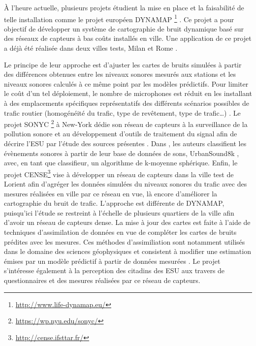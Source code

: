 \`A l'heure actuelle, plusieurs projets étudient la mise en place et la faisabilité de telle installation comme le projet européen DYNAMAP \footnote{\url{http://www.life-dynamap.eu/}} \cite{dynamap_2016}. Ce projet a pour objectif de développer un système de cartographie de bruit dynamique basé sur des réseaux de capteurs à bas coûts installés en ville. Une application de ce projet a déjà été réalisée dans deux villes tests, Milan et Rome \cite{bellucci_life_2017}.


Le principe de leur approche est d'ajuster les cartes de bruits simulées à partir des différences obtenues entre les niveaux sonores mesurés aux stations et les niveaux sonores calculés à ce même point par les modèles prédictifs. Pour limiter le coût d'un tel déploiement, le nombre de microphones est réduit en les installant à des emplacements spécifiques représentatifs des différents scénarios possibles de trafic routier (homogénéité du trafic, type de revêtement, type de trafic\dots) \cite{zambon2017life}.
Le projet SONYC \footnote{\url{https://wp.nyu.edu/sonyc/}} à New-York dédie son réseau de capteurs à la surveillance de la pollution sonore et au développement d'outils de traitement du signal afin de décrire l'ESU par l'étude des sources présentes \cite{mydlarz2017noise}. Dans \cite{salamon2015unsupervised}, les auteurs classifient les évènements sonores à partir de leur base de données de sons, UrbanSound8k \cite{salamon_dataset_nodate}, avec, en tant que classifieur, un algorithme de k-moyenne sphérique.
Enfin, le projet CENSE\footnote{\url{http://cense.ifsttar.fr/}} vise à développer un réseau de capteurs dans la ville test de Lorient afin d'agréger les données simulées du niveaux sonores du trafic avec des mesures réalisées en ville par ce réseau en vue, là encore d'améliorer la cartographie du bruit de trafic. L'approche est différente de DYNAMAP, puisqu'ici l'étude se restreint à l'échelle de plusieurs quartiers de la ville afin d'avoir un réseau de capteurs dense. La mise à jour des cartes est faite à l'aide de techniques d'assimilation de données en vue de compléter les cartes de bruits prédites avec les mesures.
Ces méthodes d'assimiliation sont notamment utilisés dans le domaine des sciences géophysiques et consistent à modifier une estimation émises par un modèle prédictif à partir de données mesurées \cite{wu2008comparison}.
Le projet s'intéresse également à la perception des citadins des ESU aux travers de questionnaires et des mesures réalisées par ce réseau de capteurs.

